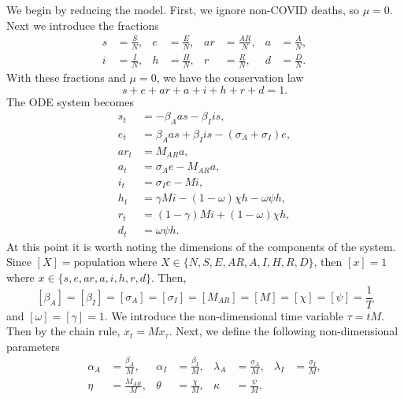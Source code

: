 \documentclass[11pt]{article}
\begin{document}
	We begin by reducing the model.
	First, we ignore non-COVID deaths, so $\mu = 0$.
	Next we introduce the fractions
	\begin{align*}
		s &= \frac{S}{N}, & e &= \frac{E}{N}, & ar &= \frac{AR}{N}, & a &= \frac{A}{N}, \\
		i &= \frac{I}{N}, & h &= \frac{H}{N}, & r &= \frac{R}{N}, & d &= \frac{D}{N}.
	\end{align*}
	With these fractions and $\mu = 0$, we have the conservation law
	\begin{equation} \label{eq:conservation}
		s + e + ar + a + i + h + r + d = 1.
	\end{equation}
	The ODE system becomes
	\begin{align*}
		s_t &=	 - \beta_{A} a s - \beta_{I} i s, \\
		e_t	&=	\beta_{A} a s + \beta_{I} i s - (\sigma_A + \sigma_I) e, \\
		ar_t &= M_{AR} a, \\
		a_t	&=	\sigma_A e - M_{AR} a, \\
		i_t	&=	\sigma_I e - M i, \\
		h_t	&=	\gamma M i - (1 - \omega) \chi h - \omega \psi h, \\
		r_t	&=	(1 - \gamma) M i + (1 - \omega) \chi h, \\
		d_t	&=	\omega \psi h.
	\end{align*}
	At this point it is worth noting the dimensions of the components of the system.
	Since $[X] = \mathrm{population}$ where $X \in \{N, S, E, AR, A, I, H, R, D\}$, then $[x] = 1$ where $x \in \{s, e, ar, a, i, h, r, d\}$.
	Then,
	$$[\beta_A] = [\beta_I] = [\sigma_A] = [\sigma_I] = [M_{AR}] = [M] = [\chi] = [\psi] = \frac{1}{T}$$
	and $[\omega] = [\gamma] = 1$.
	We introduce the non-dimensional time variable $\tau = t M$.
	Then by the chain rule, $x_t = M x_\tau$.
	Next, we define the following non-dimensional parameters
	\begin{align*}
		\alpha_A &= \frac{\beta_A}{M}, & \alpha_I &= \frac{\beta_I}{M}, & \lambda_A &= \frac{\sigma_A}{M}, & \lambda_I &= \frac{\sigma_I}{M}, \\
		\eta &= \frac{M_{AR}}{M}, & \theta &= \frac{\chi}{M}, & \kappa &= \frac{\psi}{M}.
	\end{align*}
	
\end{document}
